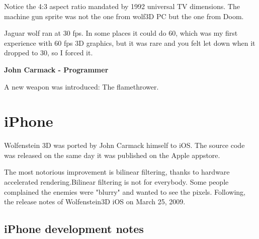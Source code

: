 \documentclass[book.tex]{subfiles}
\begin{document}
\par
\begin{figure}[H]
\centering
\end{figure}
\par
\begin{figure}[H]
\centering
\end{figure}
\par
Notice the 4:3 aspect ratio mandated by 1992 universal TV dimensions. The machine gun sprite was not the one from wolf3D PC but the one from Doom.\\

\begin{fancyquotes}
Jaguar wolf ran at 30 fps.  In some places it could do 60, which was my first experience with 60 fps 3D graphics, but it was rare and you felt let down when it dropped to 30, so I forced it.\\
\par
\textbf{John Carmack - Programmer}
 \end{fancyquotes}
\par


\begin{figure}[H]
\centering
\end{figure}
A new weapon was introduced: The flamethrower.



\section{iPhone}
Wolfenstein 3D was ported by John Carmack himself to iOS. The source code was released on the same day it was published on the Apple appstore.
    \par
\begin{figure}[H]
\centering
 \end{figure}
 \par
 The most notorious improvement is bilinear filtering, thanks to hardware accelerated rendering.Bilinear filtering is not for everybody. Some people complained the enemies were "blurry" and wanted to see the pixels. Following, the release notes of Wolfenstein3D iOS on March 25, 2009.

\subsection{iPhone development notes}
\end{document}
